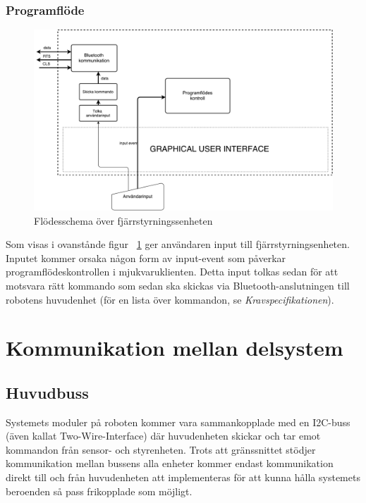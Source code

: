 \documentclass{article}
\begin{document}
\subsubsection{Programflöde}
\begin{figure}[H]
\centering 
\includegraphics[scale=0.4]{Fjarrstyrningsenhet_flowchart2}
\caption{Flödesschema över fjärrstyrningssenheten}
\label{fig:Fjarrstyrningsenhet_flowchart2}
\end{figure}
Som visas i ovanstånde figur ~\ref{fig:Fjarrstyrningsenhet_flowchart2} ger användaren input till fjärrstyrningsenheten. Inputet kommer orsaka någon form av input-event som påverkar programflödeskontrollen i mjukvaruklienten. Detta input tolkas sedan för att motsvara rätt kommando som sedan ska skickas via Bluetooth-anslutningen till robotens huvudenhet (för en lista över kommandon, se \textit{Kravspecifikationen}).

\clearpage

\section{Kommunikation mellan delsystem}

\subsection{Huvudbuss}
Systemets moduler på roboten kommer vara sammankopplade med en I2C-buss (även kallat Two-Wire-Interface) där huvudenheten skickar och tar emot kommandon från sensor- och styrenheten. Trots att gränssnittet stödjer kommunikation mellan bussens alla enheter kommer endast kommunikation direkt till och från huvudenheten att implementeras för att kunna hålla systemets beroenden så pass frikopplade som möjligt.
\end{document}
